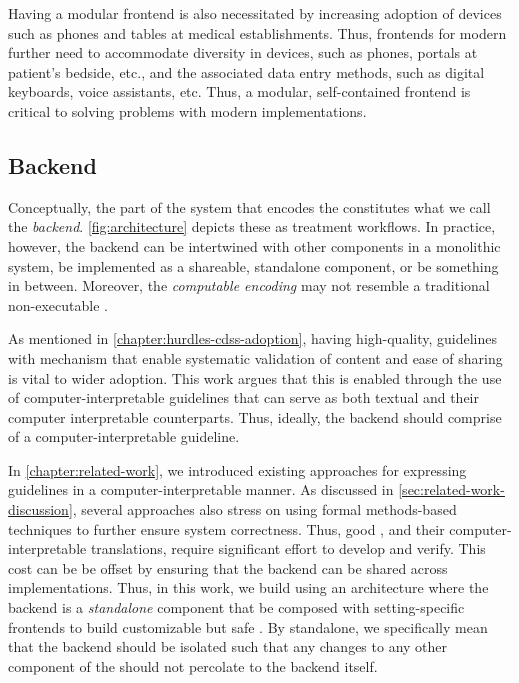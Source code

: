 Having a modular frontend is also necessitated by increasing
adoption of devices such as phones and tables at medical establishments.
Thus, frontends for modern \CDSSs{} further need to accommodate
diversity in devices, such as phones, portals at patient's bedside, etc.,
and the associated data entry methods, such as digital keyboards, voice
assistants, etc. Thus, a modular, self-contained frontend is
critical to solving problems with modern \CDSS{} implementations.

\subsection{Backend}\label{sec:backend}

Conceptually, the part of the system that encodes the \BPG{}
constitutes what we call the \emph{backend}. \autoref{fig:architecture}
depicts these as treatment workflows.
In practice, however, the backend can be intertwined with other components in a
monolithic system, be implemented as a shareable,
standalone component, or be something in between. Moreover,
the \emph{computable encoding} may not resemble a traditional
non-executable \BPG{}.

As mentioned in \autoref{chapter:hurdles-cdss-adoption}, having
high-quality, guidelines with mechanism that enable systematic
validation of content and ease of sharing is vital to wider
adoption. This work argues that this is enabled through
the use of computer-interpretable guidelines that can serve as
both textual \BPGs{} and their computer interpretable counterparts. Thus,
ideally, the backend should comprise of a computer-interpretable guideline.

In \autoref{chapter:related-work}, we introduced existing approaches
for expressing guidelines in a computer-interpretable manner.
As discussed in \autoref{sec:related-work-discussion}, several
approaches also stress on using formal methods-based techniques to further
ensure system correctness. Thus, good \BPGs{}, and
their computer-interpretable translations, require significant
effort to develop and verify. This cost can be
be offset by ensuring that the backend can be shared
across \CDSSs{} implementations. Thus, in this work, we
build \CDSSs{} using an architecture where the backend
is a \emph{standalone} component that be composed with
setting-specific frontends to build customizable but safe \CDSSs{}.
By standalone, we specifically mean that the backend should be isolated
such that any changes to any other  component of the \CDSSs{}
should not percolate to the backend itself.


